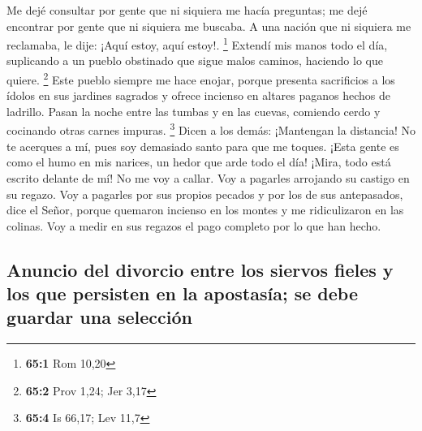  Me dejé consultar por gente que ni siquiera me hacía
preguntas; me dejé encontrar por gente que ni siquiera me buscaba. A una
nación que ni siquiera me reclamaba, le dije: ¡Aquí estoy, aquí estoy!.
\footnote{\textbf{65:1} Rom 10,20}  Extendí mis manos todo
el día, suplicando a un pueblo obstinado que sigue malos caminos,
haciendo lo que quiere. \footnote{\textbf{65:2} Prov 1,24; Jer 3,17}
 Este pueblo siempre me hace enojar, porque presenta
sacrificios a los ídolos en sus jardines sagrados y ofrece incienso en
altares paganos hechos de ladrillo.  Pasan la noche entre
las tumbas y en las cuevas, comiendo cerdo y cocinando otras carnes
impuras. \footnote{\textbf{65:4} Is 66,17; Lev 11,7} 
Dicen a los demás: ¡Mantengan la distancia! No te acerques a mí, pues
soy demasiado santo para que me toques. ¡Esta gente es como el humo en
mis narices, un hedor que arde todo el día!  ¡Mira, todo
está escrito delante de mí! No me voy a callar. Voy a pagarles arrojando
su castigo en su regazo.  Voy a pagarles por sus propios
pecados y por los de sus antepasados, dice el Señor, porque quemaron
incienso en los montes y me ridiculizaron en las colinas. Voy a medir en
sus regazos el pago completo por lo que han hecho.

\hypertarget{anuncio-del-divorcio-entre-los-siervos-fieles-y-los-que-persisten-en-la-apostasuxeda-se-debe-guardar-una-selecciuxf3n}{%
\subsection{Anuncio del divorcio entre los siervos fieles y los que
persisten en la apostasía; se debe guardar una
selección}\label{anuncio-del-divorcio-entre-los-siervos-fieles-y-los-que-persisten-en-la-apostasuxeda-se-debe-guardar-una-selecciuxf3n}}

